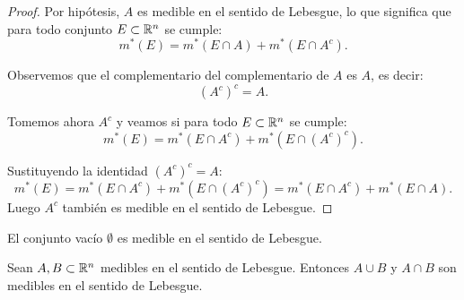 \begin{proof}
    Por hipótesis, $A$ es medible en el sentido de Lebesgue, lo que significa que para todo conjunto $E \subset \mathbb{R}^n$ se cumple:
    \[
        m^*(E) = m^*(E \cap A) + m^*(E \cap A^c).
    \]
    
    Observemos que el complementario del complementario de $A$ es $A$, es decir:
    \[
        (A^c)^c = A.
    \]
    
    Tomemos ahora $A^c$ y veamos si para todo $E \subset \mathbb{R}^n$ se cumple:
    \[
        m^*(E) = m^*(E \cap A^c) + m^*(E \cap (A^c)^c).
    \]
    
    Sustituyendo la identidad $(A^c)^c = A$:
    \[
        m^*(E) = m^*(E \cap A^c) + m^*(E \cap (A^c)^c) = m^*(E \cap A^c) + m^*(E \cap A).
    \]
    Luego $A^c$ también es medible en el sentido de Lebesgue. 
\end{proof}

\begin{corolario}
    El conjunto vacío $\emptyset$ es medible en el sentido de Lebesgue.
    \label{corolarioVacioMedible}
\end{corolario}

\begin{lema}
    Sean $A, B \subset \mathbb{R}^n$ medibles en el sentido de Lebesgue. Entonces $A \cup B$ y $A \cap B$ son medibles en el sentido de Lebesgue.\label{unionMedible}
\end{lema}

